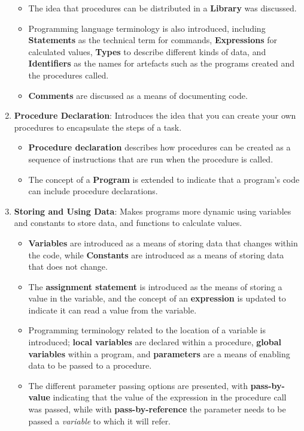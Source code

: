 \begin{enumerate}
\begin{itemize}[noitemsep,nolistsep]
    \item The idea that procedures can be distributed in a \textbf{Library} was discussed.
    \item Programming language terminology is also introduced, including \textbf{Statements} as the technical term for commands, \textbf{Expressions} for calculated values, \textbf{Types} to describe different kinds of data, and \textbf{Identifiers} as the names for artefacts such as the programs created and the procedures called. 
    \item \textbf{Comments} are discussed as a means of documenting code.
  \end{itemize}
  \item \textbf{Procedure Declaration}: Introduces the idea that you can create your own procedures to encapsulate the steps of a task. 
  \begin{itemize}[noitemsep,nolistsep]
     \item \textbf{Procedure declaration} describes how procedures can be created as a sequence of instructions that are run when the procedure is called.
     \item The concept of a \textbf{Program} is extended to indicate that a program's code can include procedure declarations.
   \end{itemize} 
  \item \textbf{Storing and Using Data}: Makes programs more dynamic using variables and constants to store data, and functions to calculate values.
  \begin{itemize}[noitemsep,nolistsep]
    \item \textbf{Variables} are introduced as a means of storing data that changes within the code, while \textbf{Constants} are introduced as a means of storing data that does not change. 
    \item The \textbf{assignment statement} is introduced as the means of storing a value in the variable, and the concept of an \textbf{expression} is updated to indicate it can read a value from the variable.
    \item Programming terminology related to the location of a variable is introduced; \textbf{local variables} are declared within a procedure, \textbf{global variables} within a program, and \textbf{parameters} are a means of enabling data to be passed to a procedure.
    \item The different parameter passing options are presented, with \textbf{pass-by-value} indicating that the value of the expression in the procedure call was passed, while with \textbf{pass-by-reference} the parameter needs to be passed a \emph{variable} to which it will refer.

\end{itemize}
\end{enumerate}
